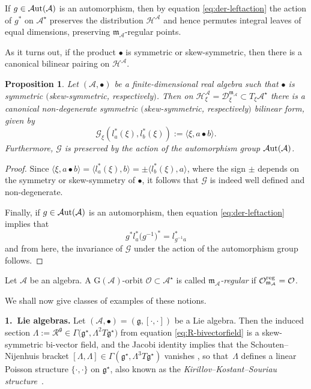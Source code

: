 \documentclass[pdftex]{sigma}
\numberwithin{equation}{section}
\newtheorem{Proposition}[Theorem]{Proposition}
 { \theoremstyle{definition}
\newtheorem{Definition}[Theorem]{Definition}
\newtheorem{Note}[Theorem]{Note}
\newtheorem{Example}[Theorem]{Example}
\newtheorem{Remark}[Theorem]{Remark} }
\newcommand{\be}{\begin{equation}}
\newcommand{\ee}{\end{equation}}
\newcommand{\hh}{\mathcal{H}}
\newcommand{\Aut}{\mathcal{A}{\rm ut}}
\newcommand{\ocal}{\mathcal{O}}
\newcommand{\dcal}{\mathcal{D}}
\newcommand{\m}{\mathfrak{m}}
\newcommand{\G}{\mathrm{G}}
\newcommand{\g}{{\mathfrak{g}}}
\renewcommand{\m}{{\mathfrak m}}
\newcommand{\cR}{\mathcal{R}}
\newcommand{\cA}{\mathcal{A}}
\newcommand{\Gcal}{\mathcal{G}}
\begin{document}
If $g \in \Aut(\cA)$ is an automorphism, then by equation \eqref{eq:der-leftaction} the action of $g^\ast$ on $\cA^\star$ preserves the distribution $\hh^\cA$ and hence permutes integral leaves of equal dimensions, preserving $\m_\cA$-regular points.

As it turns out, if the product $\bullet$ is symmetric or skew-symmetric, then there is a canonical bilinear pairing on $\hh^\cA$.

\begin{Proposition} \label{prop:inner-product}
Let $(\cA, \bullet)$ be a finite-dimensional real algebra such that $\bullet$ is symmetric $($skew-symmetric, respectively$)$.
Then on $\hh^\cA_\xi = \dcal^{\m_\cA}_\xi \subset T_\xi \cA^\star$ there is a canonical non-degenerate symmetric $($skew-symmetric, respectively$)$ bilinear form, given by
\be \label{eq:inner-productA}
\Gcal_\xi (l_a^\ast(\xi), l_b^\ast(\xi)) := \langle \xi, a \bullet b \rangle.
\ee
Furthermore, $\Gcal$ is preserved by the action of the automorphism group $\Aut(\cA)$.
\end{Proposition}

\begin{proof} Since $\langle \xi, a \bullet b \rangle = \langle l_a^\ast(\xi), b\rangle = \pm \langle l_b^\ast(\xi), a\rangle$, where the sign $\pm$ depends on the symmetry or skew-symmetry of $\bullet$, it follows that $\Gcal$ is indeed well defined and non-degenerate.

Finally, if $g \in \Aut(\cA)$ is an automorphism, then equation \eqref{eq:der-leftaction} implies that
\[
g^\ast l_a^\ast \big(g^{-1}\big)^\ast = l_{g^{-1}a}^\ast
\]
and from here, the invariance of $\Gcal$ under the action of the automorphism group follows.
\end{proof}

\begin{Definition} \label{def:regular-A} Let $\cA$ be an algebra. A $\G(\cA)$-orbit $\ocal \subset \cA^\star$ is called {\em $\m_\cA$-regular } if $\ocal^{\rm reg}_{\m_\cA} = \ocal$.
\end{Definition}

We shall now give classes of examples of these notions.

{\bf 1.\ Lie algebras.}
Let $(\cA, \bullet) = (\g, [\cdot, \cdot])$ be a Lie algebra. Then the induced section $\Lambda := \cR^\g \in \Gamma\big(\g^\star, \Lambda^2 T\g^\star\big)$ from equation \eqref{eq:R-bivectorfield} is a skew-symmetric bi-vector field, and the Jacobi identity implies that the Schouten--Nijenhuis bracket $[\Lambda, \Lambda] \in \Gamma(\g^\star, \Lambda^3 T\g^\star)$ vanishes \cite{Lichnerowicz-1977,Tulczyjew-1974}, so that~$\Lambda$ defines a linear Poisson structure $\{\cdot,\cdot\}$ on $\g^\star$, also known as the {\em Kirillov--Kostant--Souriau structure}~\cite{Kirillov-2004}.
\end{document}
